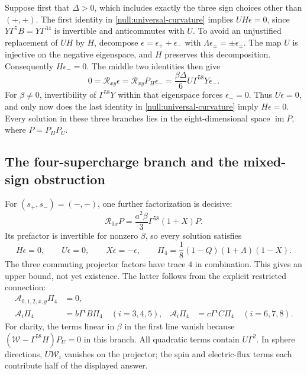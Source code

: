 Suppose first that $\Delta>0$, which includes exactly the three sign choices other than $(+,+)$. The first identity in \eqref{null:universal-curvature} implies $UH\epsilon=0$, since $Y\Gamma^5B=Y\Gamma^{34}$ is invertible and anticommutes with $U$. To avoid an unjustified replacement of $UH$ by $H$, decompose $\epsilon=\epsilon_++\epsilon_-$ with $\Lambda\epsilon_\pm=\pm\epsilon_\pm$. The map $U$ is injective on the negative eigenspace, and $H$ preserves this decomposition. Consequently $H\epsilon_-=0$. The middle two identities then give
\begin{equation}\label{null:negative-sector}
 0=\mathcal R_{xy}\epsilon=\mathcal R_{xy}P_H\epsilon_-
   =\frac{\beta\Delta}{6}U\Gamma^{58}Y\epsilon_-.
\end{equation}
For $\beta\ne0$, invertibility of $\Gamma^{58}Y$ within that eigenspace forces $\epsilon_-=0$. Thus $U\epsilon=0$, and only now does the last identity in \eqref{null:universal-curvature} imply $H\epsilon=0$. Every solution in these three branches lies in the eight-dimensional space $\operatorname{im}P$, where $P=P_HP_U$.

\subsection{The four-supercharge branch and the mixed-sign obstruction}

For $(s_+,s_-)=(-,-)$, one further factorization is decisive:
\begin{equation}\label{null:four-upper}
 \mathcal R_{0x}P=\frac{a^2\beta}{3}\Gamma^{58}(1+X)P.
\end{equation}
Its prefactor is invertible for nonzero $\beta$, so every solution satisfies
\begin{equation}\label{null:four-projector}
 H\epsilon=0,\qquad U\epsilon=0,\qquad X\epsilon=-\epsilon,
 \qquad \Pi_4=\frac18(1-Q)(1+\Lambda)(1-X).
\end{equation}
The three commuting projector factors have trace $4$ in combination. This gives an upper bound, not yet existence. The latter follows from the explicit restricted connection:
\begin{equation}\label{null:four-connection}
 \begin{aligned}
 \mathcal A_{0,1,2,x,y}\Pi_4&=0,\\
 \mathcal A_i\Pi_4&=b\Gamma^iB\Pi_4\quad(i=3,4,5),&
 \mathcal A_i\Pi_4&=c\Gamma^iC\Pi_4\quad(i=6,7,8).
 \end{aligned}
\end{equation}
For clarity, the terms linear in $\beta$ in the first line vanish because
$(\mathcal W-\Gamma^{58}H)P_U=0$ in this branch. All quadratic terms contain $U\Gamma^2$. In sphere directions, $U\mathcal W_i$ vanishes on the projector; the spin and electric-flux terms each contribute half of the displayed answer.

